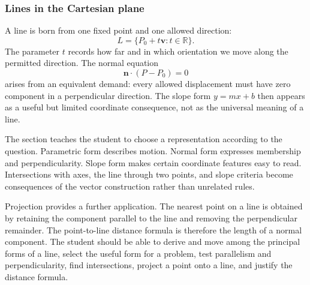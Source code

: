 \subsubsection*{Lines in the Cartesian plane}

A line is born from one fixed point and one allowed direction:
\[
L=\{P_0+t\mathbf v:t\in\mathbb R\}.
\]
The parameter $t$ records how far and in which orientation we move along the
permitted direction. The normal equation
\[
\mathbf n\cdot(P-P_0)=0
\]
arises from an equivalent demand: every allowed displacement must have zero
component in a perpendicular direction. The slope form $y=mx+b$ then appears as
a useful but limited coordinate consequence, not as the universal meaning of a
line.

The section teaches the student to choose a representation according to the
question. Parametric form describes motion. Normal form expresses membership and
perpendicularity. Slope form makes certain coordinate features easy to read.
Intersections with axes, the line through two points, and slope criteria become
consequences of the vector construction rather than unrelated rules.

Projection provides a further application. The nearest point on a line is obtained
by retaining the component parallel to the line and removing the perpendicular
remainder. The point-to-line distance formula is therefore the length of a normal
component. The student should be able to derive and move among the principal
forms of a line, select the useful form for a problem, test parallelism and
perpendicularity, find intersections, project a point onto a line, and justify
the distance formula.
